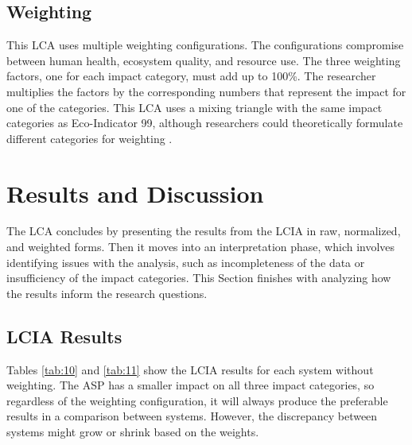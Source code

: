 \documentclass[final,journal,10pt,letterpaper,oneside,twocolumn,compsoc]%
{IEEEtran}
\begin{document}
\subsection{Weighting}
This LCA uses multiple weighting configurations. The configurations compromise
between human health, ecosystem quality, and resource use.
The three weighting factors, one for each impact category, must add up to 100\%.
The researcher multiplies the factors by the corresponding numbers that
represent the impact for one of the categories.
This LCA uses a mixing triangle with the
same impact categories as Eco-Indicator 99, although researchers could
theoretically formulate different categories for weighting \cite{triangle}.

\section{Results and Discussion}
The LCA concludes by presenting the results from the LCIA in raw, normalized,
and weighted forms. Then it moves into an interpretation phase, which
involves identifying issues with the analysis, such as incompleteness of the
data or insufficiency of the impact categories. This Section finishes with
analyzing how the results inform the research questions.

\subsection{LCIA Results}
Tables \ref{tab:10} and \ref{tab:11} show the LCIA results for each system
without weighting. The ASP
has a smaller impact on all three impact categories, so regardless of the
weighting configuration, it will always produce the preferable results in a
comparison between systems. However, the discrepancy between systems might grow
or shrink based on the weights.
\end{document}

